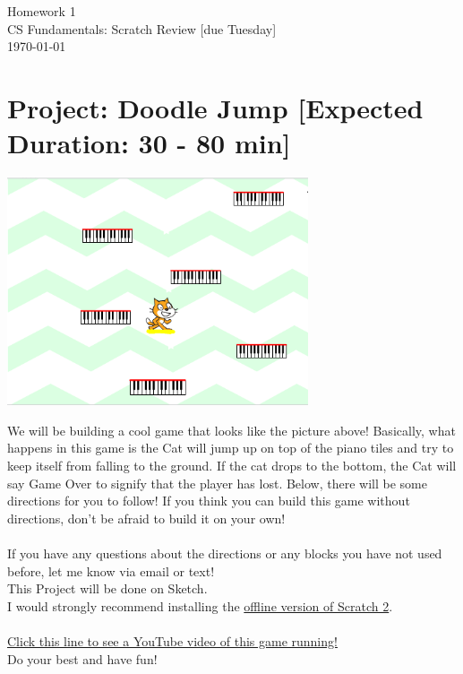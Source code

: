 \documentclass[11pt]{article}
\newcommand{\myhwname}{Homework 1}
\newcommand{\mysection}{CS Fundamentals: Scratch Review [due Tuesday]}
\begin{document}
\begin{center}
    {\Large \myhwname} \\
    \mysection \\
    \today
\end{center}

\section{Project: Doodle Jump [Expected Duration: 30 - 80 min]}
\begin{center}
  \includegraphics[width=3.5in]{preview.png}
 \end{center}
We will be building a cool game that looks like the picture above! Basically, what happens in this game is the Cat will jump up on top of the piano tiles and try to keep itself from falling to the ground. If the cat drops to the bottom, the Cat will say Game Over to signify that the player has lost. Below, there will be some directions for you to follow! If you think you can build this game without directions, don't be afraid to build it on your own!\\\\
If you have any questions about the directions or any blocks you have not used before, let me know via email or text!\\
This Project will be done on Sketch.\\
I would strongly recommend installing the \href{https://scratch.mit.edu/scratch2download/}{offline version of Scratch 2}.\\\\
\href{https://youtu.be/ZJAsPQanvtg}{Click this line to see a YouTube video of this game running!}\\
Do your best and have fun!
\end{document}
